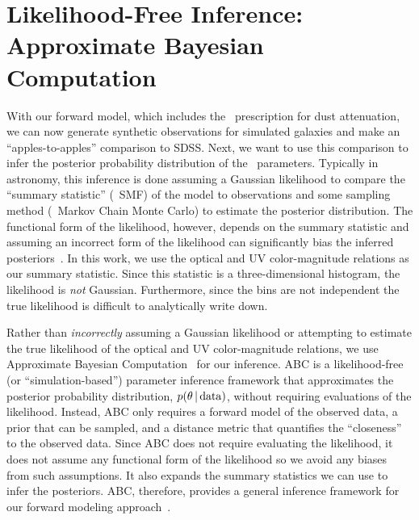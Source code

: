 \section{Likelihood-Free Inference: Approximate Bayesian Computation} \label{sec:abc}
With our forward model, which includes the \eda~prescription for dust
attenuation, we can now generate synthetic observations for simulated
galaxies and make an ``apples-to-apples'' comparison to SDSS. Next, we want
to use this comparison to infer the posterior probability distribution of
the \eda~parameters. Typically in astronomy, this inference is done
assuming a Gaussian likelihood to compare the ``summary statistic''
(\eg~SMF) of the model to observations and some sampling method (\eg~Markov
Chain Monte Carlo) to estimate the posterior distribution. The functional form of the
likelihood, however, depends on the summary statistic and assuming an
incorrect form of the likelihood can significantly bias the inferred
posteriors~\citep[\eg][]{hahn2019}. In this work, we use the optical and UV
color-magnitude relations as our summary statistic. Since this statistic is
a three-dimensional histogram, the likelihood is {\em not} Gaussian.
Furthermore, since the bins are not independent the true likelihood is
difficult to analytically write down.

Rather than \emph{incorrectly} assuming a Gaussian likelihood or attempting
to estimate the true likelihood of the optical and UV color-magnitude
relations, we use Approximate Bayesian Computation~\citep[hereafter
ABC;][]{diggle1984, tavare1997, pritchard1999, beaumont2009, delmoral2012}
for our inference. 
ABC is a likelihood-free (or ``simulation-based'') parameter inference
framework that approximates the posterior probability distribution, $p(\theta\,|\,{\rm data})$, without
requiring evaluations of the likelihood.  Instead, ABC only requires a forward
model of the observed data, a prior that can be sampled, and a distance metric
that quantifies the ``closeness'' to the observed data. 
Since ABC does not require evaluating the likelihood, it does not assume
any functional form of the likelihood so we avoid any biases from such
assumptions. 
It also expands the summary statistics we can use to infer the posteriors.
ABC, therefore, provides a general inference framework for our forward
modeling approach~\citep{hahn2017a}. 

